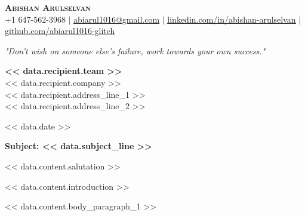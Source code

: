 \documentclass[letterpaper,11pt]{article}
\begin{document}
\begin{center}
    {\Huge \scshape \textbf{Abishan Arulselvan}} \\ \vspace{6pt}
    \small +1 647-562-3968 $|$ 
    \href{abiarul1016@gmail.com}{\underline{abiarul1016@gmail.com}} $|$ 
    \href{https://www.linkedin.com/in/abishan-arulselvan/}{\underline{linkedin.com/in/abishan-arulselvan}} $|$
    \href{https://github.com/abiarul1016-glitch}{\underline{github.com/abiarul1016-glitch}}
    
    \vspace{10pt}
    \textit{"Don't wish on someone else's failure, work towards your own success."}
\end{center}

\vspace{0.5em}

\begin{flushleft}
    \setlength{\parindent}{0pt} %
    \textbf{<< data.recipient.team >>} \\
    \vspace{0.5em}
    << data.recipient.company >> \\
    << data.recipient.address_line_1 >> \\
    << data.recipient.address_line_2 >>
\end{flushleft}

\vspace{1em}

{\setlength{\parindent}{0pt} << data.date >> \par}

\vspace{1em}

{\setlength{\parindent}{0pt} \textbf{Subject: << data.subject_line >>} \par}

\vspace{1em}

{\setlength{\parindent}{0pt} << data.content.salutation >> \par}

\vspace{0.5em}

<< data.content.introduction >>

<< data.content.body_paragraph_1 >>
\end{document}
